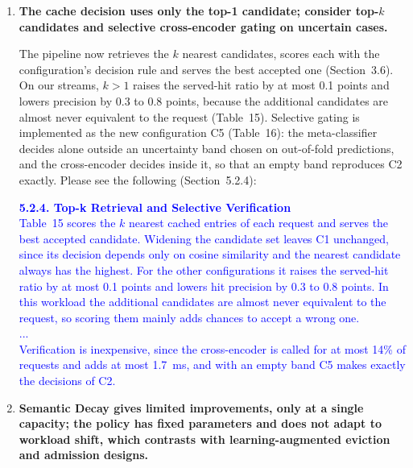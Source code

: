 \documentclass[11pt]{article}
\begin{document}
\begin{enumerate}[leftmargin=*, itemsep=1.2em]

\item \textbf{The cache decision uses only the top-1 candidate; consider top-$k$ candidates and selective cross-encoder gating on uncertain cases.}

The pipeline now retrieves the $k$ nearest candidates, scores each with the configuration's decision rule and serves the best accepted one (Section~3.6). On our streams, $k>1$ raises the served-hit ratio by at most 0.1 points and lowers precision by 0.3 to 0.8 points, because the additional candidates are almost never equivalent to the request (Table~15). Selective gating is implemented as the new configuration C5 (Table~16): the meta-classifier decides alone outside an uncertainty band chosen on out-of-fold predictions, and the cross-encoder decides inside it, so that an empty band reproduces C2 exactly. Please see the following (Section~5.2.4):

\textcolor{blue}{\textbf{5.2.4. Top-k Retrieval and Selective Verification}\\
Table~15 scores the $k$ nearest cached entries of each request and serves the best accepted candidate. Widening the candidate set leaves C1 unchanged, since its decision depends only on cosine similarity and the nearest candidate always has the highest. For the other configurations it raises the served-hit ratio by at most 0.1 points and lowers hit precision by 0.3 to 0.8 points. In this workload the additional candidates are almost never equivalent to the request, so scoring them mainly adds chances to accept a wrong one.\\
...\\
Verification is inexpensive, since the cross-encoder is called for at most 14\% of requests and adds at most 1.7~ms, and with an empty band C5 makes exactly the decisions of C2.}

\item \textbf{Semantic Decay gives limited improvements, only at a single capacity; the policy has fixed parameters and does not adapt to workload shift, which contrasts with learning-augmented eviction and admission designs.}


\end{enumerate}
\end{document}
